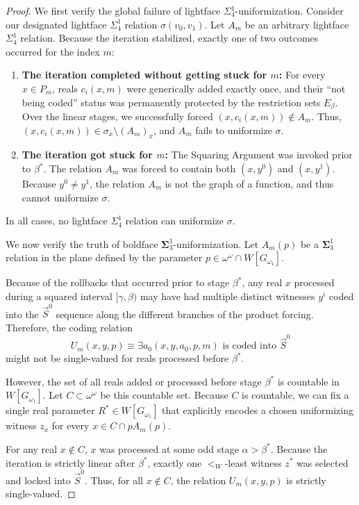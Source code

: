 \documentclass{article}
\theoremstyle{plain}
\theoremstyle{definition}
\begin{document}
\begin{proof}
We first verify the global failure of lightface $\Sigma^1_4$-uniformization. Consider our designated lightface $\Sigma^1_4$ relation $\sigma(v_0, v_1)$. Let $A_m$ be an arbitrary lightface $\Sigma^1_4$ relation. Because the iteration stabilized, exactly one of two outcomes occurred for the index $m$:
\begin{enumerate}
    \item \textbf{The iteration completed without getting stuck for $m$:} For every $x \in P_m$, reals $c_i(x,m)$ were generically added exactly once, and their ``not being coded'' status was permanently protected by the restriction sets $E_\beta$. Over the linear stages, we successfully forced $(x, c_i(x,m)) \notin A_m$. Thus, $(x, c_i(x,m)) \in \sigma_x \setminus (A_m)_x$, and $A_m$ fails to uniformize $\sigma$.
    \item \textbf{The iteration got stuck for $m$:} The Squaring Argument was invoked prior to $\beta^*$. The relation $A_m$ was forced to contain both $(x, y^0)$ and $(x, y^1)$. Because $y^0 \neq y^1$, the relation $A_m$ is not the graph of a function, and thus cannot uniformize $\sigma$.
\end{enumerate}
In all cases, no lightface $\Sigma^1_4$ relation can uniformize $\sigma$.

We now verify the truth of boldface $\mathbf{\Sigma}^1_3$-uniformization. Let $A_m(p)$ be a $\mathbf{\Sigma}^1_3$ relation in the plane defined by the parameter $p \in \omega^\omega \cap W[G_{\omega_1}]$. 

Because of the rollbacks that occurred prior to stage $\beta^*$, any real $x$ processed during a squared interval $[\gamma, \beta)$ may have had multiple distinct witnesses $y^i$ coded into the $\vec{S}^0$ sequence along the different branches of the product forcing. Therefore, the coding relation
\[ U_m(x, y,p) \equiv \exists a_0 (x,y,a_0,p, m) \text{ is coded into } \vec{S}^0 \]
might not be single-valued for reals processed before $\beta^*$. 

However, the set of all reals added or processed before stage $\beta^*$ is countable in $W[G_{\omega_1}]$. Let $C \subset \omega^\omega$ be this countable set. Because $C$ is countable, we can fix a single real parameter $R^* \in W[G_{\omega_1}]$ that explicitly encodes a chosen uniformizing witness $z_x$ for every $x \in C \cap pA_m(p)$. 

For any real $x \notin C$, $x$ was processed at some odd stage $\alpha > \beta^*$. Because the iteration is strictly linear after $\beta^*$, exactly one $<_W$-least witness $z^*$ was selected and locked into $\vec{S}^0$. Thus, for all $x \notin C$, the relation $U_m(x, y,p)$ is strictly single-valued.


\end{proof}
\end{document}
